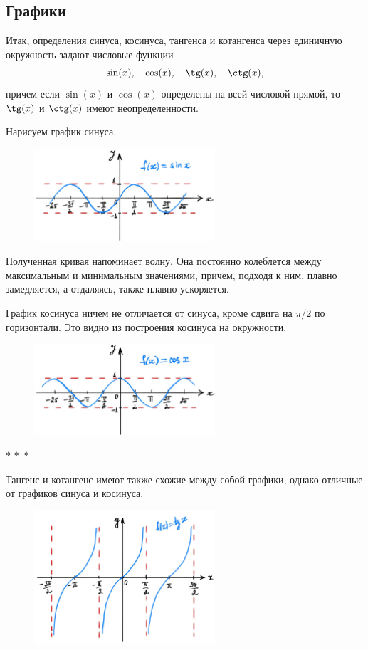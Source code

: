 \documentclass[a4paper,12pt]{article}
\newcommand{\threestars}{\begin{center}$ {\ast}\,{\ast}\,{\ast} $\end{center}}
\newcounter{th-counter}
\begin{document}
\subsection*{Графики}
Итак, определения синуса, косинуса, тангенса и котангенса через единичную окружность задают числовые функции
\[\sin(x), \quad \cos(x),\quad \tg(x), \quad \ctg(x),\]
причем если $\sin(x)$ и $\cos(x)$ определены на всей числовой прямой, то $\tg(x)$ и $\ctg(x)$ имеют неопределенности.

Нарисуем график синуса.
\begin{figure}[H]
    \centering
    \includegraphics[width=0.6\textwidth]{pictures/pct_sinus_plot.jpg}
\end{figure}

Полученная кривая напоминает волну. Она постоянно колеблется между максимальным и минимальным значениями, причем, подходя к ним, плавно замедляется, а отдаляясь, также плавно ускоряется.

График косинуса ничем не отличается от синуса, кроме сдвига на $\pi/2$ по горизонтали. Это видно из построения косинуса на окружности.

\begin{figure}[H]
    \centering
    \includegraphics[width=0.6\textwidth]{pictures/pct_cosinus_plot.jpg}
\end{figure}

\threestars

Тангенс и котангенс имеют также схожие между собой графики, однако отличные от графиков синуса и косинуса.
\begin{figure}[H]
    \centering
    \includegraphics[width=0.6\textwidth]{pictures/pct_tangence_plot.jpg}
\end{figure}
\end{document}
